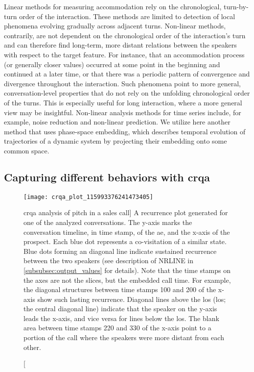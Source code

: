 Linear methods for measuring accommodation rely on the chronological, turn-by-turn order of the interaction.
These methods are limited to detection of local phenomena evolving gradually across adjacent turns.
Non-linear methods, contrarily, are not dependent on the chronological order of the interaction's turn and can therefore find long-term, more distant relations between the speakers with respect to the target feature.
For instance, that an accommodation process (or generally closer values) occurred at some point in the beginning and continued at a later time, or that there was a periodic pattern of convergence and divergence throughout the interaction.
Such phenomena point to more general, conversation-level properties that do not rely on the unfolding chronological order of the turns.
This is especially useful for long interaction, where a more general view may be insightful.
Non-linear analysis methods for time series include, for example, noise reduction and non-linear prediction.
We utilize here another method that uses phase-space embedding, which describes temporal evolution of trajectories of a dynamic system by projecting their embedding onto some common space.


\subsection{Capturing different behaviors with \acs{crqa}}
\label{subsec:capturing_behaviors}

\begin{figure}[t]
	\centering
	\texttt{[image: crqa\_plot\_115993376241473405]}
	\caption
	[\acs{crqa} analysis of pitch in a sales call]
	{A recurrence plot generated for one of the analyzed conversations.
		The y-axis marks the conversation timeline, in time stamp, of the \ac{ae}, and the x-axis of the prospect.
		Each blue dot represents a co-visitation of a similar state.
		Blue dots forming an diagonal line indicate sustained recurrence between the two speakers (see description of NRLINE in \cref{subsubsec:output_values} for details).
		Note that the time stamps on the axes are not the slices, but the embedded call time. 
		For example, the diagonal structures between time stamps 100 and 200 of the x-axis show such lasting recurrence.
		Diagonal lines above the \acl{los} (\acs{los}; the central diagonal line) indicate that the speaker on the y-axis leads the x-axis, and vice versa for lines below the \ac{los}.
		The blank area between time stamps 220 and 330 of the x-axis point to a portion of the call where the speakers were more distant from each other.}
	\label{fig:crqa_plot}
\end{figure}

